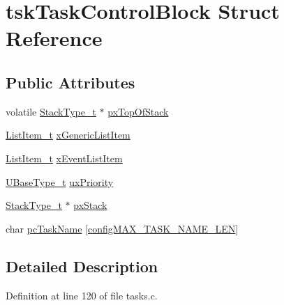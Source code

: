 \hypertarget{structtsk_task_control_block}{}\section{tsk\+Task\+Control\+Block Struct Reference}
\label{structtsk_task_control_block}
\subsection*{Public Attributes}
\begin{DoxyCompactItemize}
\item 
volatile \hyperlink{_g_c_c_2_a_r_m___c_m3_2portmacro_8h_a84e9a8ba132feed0b2401c1f4e2ac63c}{Stack\+Type\+\_\+t} $\ast$ \hyperlink{structtsk_task_control_block_a429a186c7f8e34aba1eef5e12d215b90}{px\+Top\+Of\+Stack}
\item 
\hyperlink{list_8h_a1a62d469392f9bfe2443e7efab9c8398}{List\+Item\+\_\+t} \hyperlink{structtsk_task_control_block_af331a67daadbafd0e66098e8111cfa4b}{x\+Generic\+List\+Item}
\item 
\hyperlink{list_8h_a1a62d469392f9bfe2443e7efab9c8398}{List\+Item\+\_\+t} \hyperlink{structtsk_task_control_block_a1a1612b6081a13683808284d93a9b28f}{x\+Event\+List\+Item}
\item 
\hyperlink{_g_c_c_2_a_r_m___c_m3_2portmacro_8h_a646f89d4298e4f5afd522202b11cb2e6}{U\+Base\+Type\+\_\+t} \hyperlink{structtsk_task_control_block_a79187811e3d2a15595942e3b44237d85}{ux\+Priority}
\item 
\hyperlink{_g_c_c_2_a_r_m___c_m3_2portmacro_8h_a84e9a8ba132feed0b2401c1f4e2ac63c}{Stack\+Type\+\_\+t} $\ast$ \hyperlink{structtsk_task_control_block_a9a0d71a9f95dd0609f9911d9efd79134}{px\+Stack}
\item 
char \hyperlink{structtsk_task_control_block_a67d61291794f38afb5be5132078bc24f}{pc\+Task\+Name} \mbox{[}\hyperlink{projects_2xpressohack_2_open_w_s_n___o_s_2src_2_free_r_t_o_s_config_8h_ac388dc4041aab6997348828eb27fc1a8}{config\+M\+A\+X\+\_\+\+T\+A\+S\+K\+\_\+\+N\+A\+M\+E\+\_\+\+L\+EN}\mbox{]}
\end{DoxyCompactItemize}


\subsection{Detailed Description}


Definition at line 120 of file tasks.\+c.



